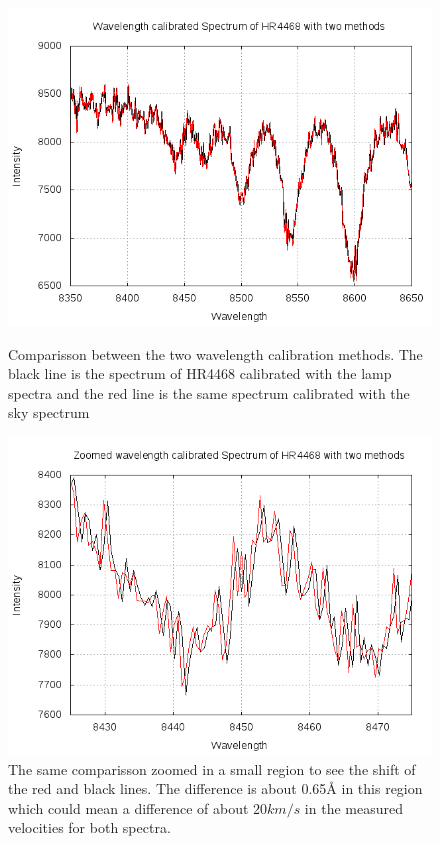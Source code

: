 \begin{figure}[H]
  \centering
  \begin{minipage}[b]{0.49\textwidth}
    \includegraphics[width=\textwidth]{images/Espectros.png}
    \caption[Comparisson between the two wavelength calibration methods]{Comparisson between the two wavelength calibration methods. The black line is the spectrum of HR4468 calibrated with the lamp spectra and the red line is the same spectrum calibrated with the sky spectrum}
  \end{minipage}
  \hfill
  \begin{minipage}[b]{0.49\textwidth}
    \includegraphics[width=\textwidth]{images/Espectros2.png}
    \caption[Zoomed comparisson between the two wavelength calibration methods]{The same comparisson zoomed in a small region to see the shift of the red and black lines. The difference is about 0.65$\textrm{\AA}$ in this region which could mean a difference of about $20km/s$ in the measured velocities for both spectra.}
  \end{minipage}
\end{figure}

